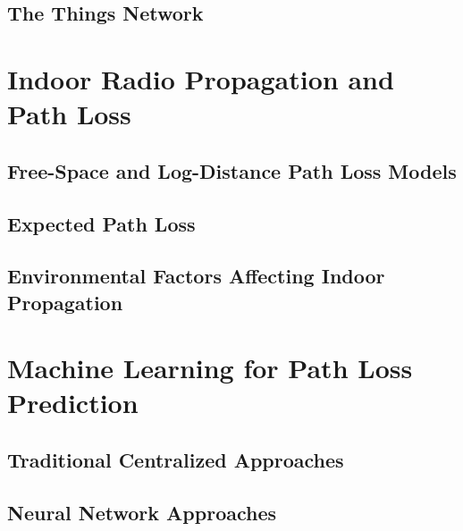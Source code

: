 \subsection{The Things Network}

\section{Indoor Radio Propagation and Path Loss}
\label{sec:path-loss-theory}

\subsection{Free-Space and Log-Distance Path Loss Models}

\subsection{Expected Path Loss}

\subsection{Environmental Factors Affecting Indoor Propagation}

\section{Machine Learning for Path Loss Prediction}
\label{sec:ml-pathloss}

\subsection{Traditional Centralized Approaches}

\subsection{Neural Network Approaches}

